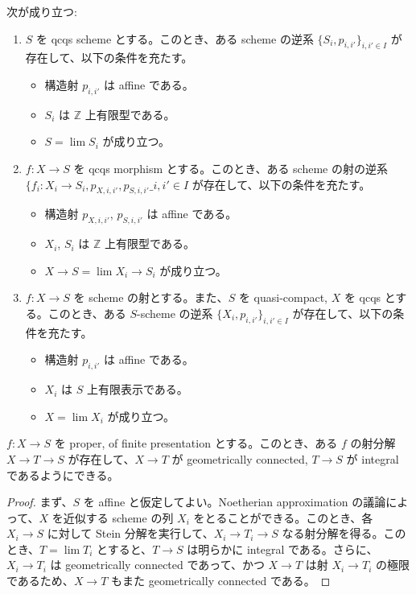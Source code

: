 \begin{prop}
  次が成り立つ:
  \begin{enumerate}
    \item $S$ を qcqs scheme とする。このとき、ある scheme の逆系 $\{S_i, p_{i, i'}\}_{i, i'\in I}$ が存在して、以下の条件を充たす。
      \begin{itemize}
        \item 構造射 $p_{i, i'}$ は affine である。
        \item $S_i$ は $\mathbb{Z}$ 上有限型である。
        \item $S = \lim S_i$ が成り立つ。
      \end{itemize}
    \item $f \colon X \to S$ を qcqs morphism とする。このとき、ある scheme の射の逆系 $\{f_i \colon X_i \to S_i, p_{X, i, i'}, p_{S, i, i'}\_{i, i' \in I}$ が存在して、以下の条件を充たす。
      \begin{itemize}
        \item 構造射 $p_{X, i, i'}$, $p_{S, i, i'}$ は affine である。
        \item $X_i$, $S_i$ は $\mathbb{Z}$ 上有限型である。
        \item $X \to S = \lim X_i \to S_i$ が成り立つ。
      \end{itemize}
    \item $f \colon X \to S$ を scheme の射とする。また、$S$ を quasi-compact, $X$ を qcqs とする。このとき、ある $S$-scheme の逆系 $\{X_i, p_{i, i'}\}_{i, i' \in I}$ が存在して、以下の条件を充たす。
    \begin{itemize}
      \item 構造射 $p_{i, i'}$ は affine である。
      \item $X_i$ は $S$ 上有限表示である。
      \item $X = \lim X_i$ が成り立つ。
    \end{itemize}
  \end{enumerate}
\end{prop}

\begin{prop}[Stein 分解]
  $f \colon X \to S$ を proper, of finite presentation とする。このとき、ある $f$ の射分解 $X \to T \to S$ が存在して、$X \to T$ が geometrically connected, $T \to S$ が integral であるようにできる。
\end{prop}
\begin{proof}
  まず、$S$ を affine と仮定してよい。Noetherian approximation の議論によって、$X$ を近似する scheme の列 $X_i$ をとることができる。このとき、各 $X_i \to S$ に対して Stein 分解を実行して、$X_i \to T_i \to S$ なる射分解を得る。このとき、$T = \lim T_i$ とすると、$T \to S$ は明らかに integral である。さらに、$X_i \to T_i$ は geometrically connected であって、かつ $X \to T$ は射 $X_i \to T_i$ の極限であるため、$X \to T$ もまた geometrically connected である。
\end{proof}

\begin{prop}
  
\end{prop}

